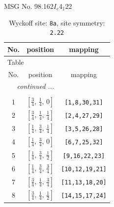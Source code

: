 \documentclass[fleqn,8pt]{jsarticle}
\begin{document}
\setcounter{MaxMatrixCols}{32}

\renewcommand{\tablename}{Table~}
\renewcommand{\figurename}{Figure~}
\begin{center}
\LARGE
MSG No. 98.162\quad$I_{c}4_{1}22$
\end{center}
\renewcommand{\arraystretch}{1.2}
\begin{longtable}{ccc}
\caption{Wyckoff site: {\tt 8a}, site symmetry: {\tt 2.22}}
 \\
 \hline \hline
No. & position & mapping \\ \hline \endfirsthead

\multicolumn{2}{l}{\tablename\ \thetable{}} \\
 \hline \hline
No. & position & mapping \\ \hline \endhead

 \hline \hline
\multicolumn{2}{r}{\footnotesize\it continued ...} \\ \endfoot

 \hline \hline
\multicolumn{2}{r}{} \\ \endlastfoot

1 & $\left[ \frac{3}{4},\, \frac{1}{4},\, 0 \right]$ & {\tt [1,8,30,31]} \\ \hline
2 & $\left[ \frac{3}{4},\, \frac{1}{4},\, \frac{1}{4} \right]$ & {\tt [2,4,27,29]} \\ \hline
3 & $\left[ \frac{1}{4},\, \frac{3}{4},\, \frac{1}{4} \right]$ & {\tt [3,5,26,28]} \\ \hline
4 & $\left[ \frac{1}{4},\, \frac{3}{4},\, 0 \right]$ & {\tt [6,7,25,32]} \\ \hline
5 & $\left[ \frac{1}{4},\, \frac{3}{4},\, \frac{1}{2} \right]$ & {\tt [9,16,22,23]} \\ \hline
6 & $\left[ \frac{1}{4},\, \frac{3}{4},\, \frac{3}{4} \right]$ & {\tt [10,12,19,21]} \\ \hline
7 & $\left[ \frac{3}{4},\, \frac{1}{4},\, \frac{3}{4} \right]$ & {\tt [11,13,18,20]} \\ \hline
8 & $\left[ \frac{3}{4},\, \frac{1}{4},\, \frac{1}{2} \right]$ & {\tt [14,15,17,24]} \\
\end{longtable}
\renewcommand{\arraystretch}{1.2}
\end{document}
